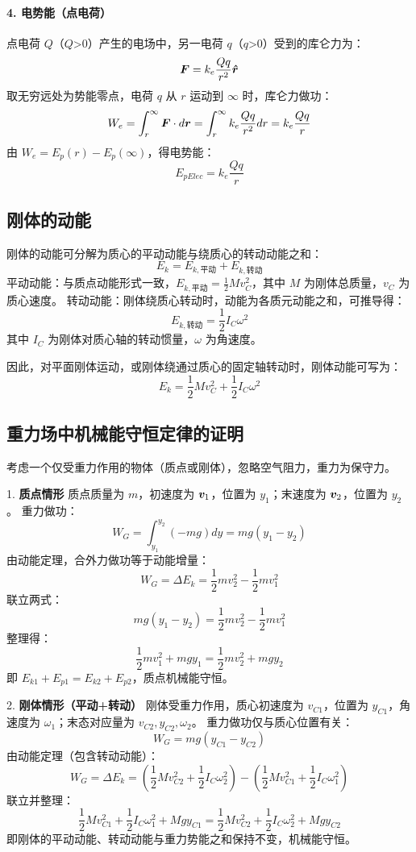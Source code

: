 \paragraph{4. 电势能（点电荷）}
点电荷 \(Q\)（\(Q\)>0）产生的电场中，另一电荷 \(q\)（\(q\)>0）受到的库仑力为：
\[
\boldsymbol{F} = k_e\frac{Qq}{r^2}\boldsymbol{\hat{r}}
\]
取无穷远处为势能零点，电荷 \(q\) 从 \(r\) 运动到 \(\infty\) 时，库仑力做功：
\[
W_e = \int_{r}^{\infty} \boldsymbol{F} \cdot d\boldsymbol{r} = \int_{r}^{\infty} k_e\frac{Qq}{r^2} dr = k_e\frac{Qq}{r}
\]
由 \(W_e = E_p(r) - E_p(\infty)\)，得电势能：
\[
E_{pElec} = k_e\frac{Qq}{r}
\]

\subsection{刚体的动能}
刚体的动能可分解为质心的平动动能与绕质心的转动动能之和：
\[
E_k = E_{k,\text{平动}} + E_{k,\text{转动}}
\]
平动动能：与质点动能形式一致，\(E_{k,\text{平动}} = \frac{1}{2}Mv_C^2\)，其中 \(M\) 为刚体总质量，\(v_C\) 为质心速度。
转动动能：刚体绕质心转动时，动能为各质元动能之和，可推导得：
\[
E_{k,\text{转动}} = \frac{1}{2}I_C\omega^2
\]
其中 \(I_C\) 为刚体对质心轴的转动惯量，\(\omega\) 为角速度。

因此，对平面刚体运动，或刚体绕通过质心的固定轴转动时，刚体动能可写为：
\[
E_k = \frac{1}{2}Mv_C^2 + \frac{1}{2}I_C\omega^2
\]

\subsection{重力场中机械能守恒定律的证明}
考虑一个仅受重力作用的物体（质点或刚体），忽略空气阻力，重力为保守力。

1.  \textbf{质点情形}
    质点质量为 \(m\)，初速度为 \(\boldsymbol{v}_1\)，位置为 \(y_1\)；末速度为 \(\boldsymbol{v}_2\)，位置为 \(y_2\)。
    重力做功：
    \[
    W_G = \int_{y_1}^{y_2} (-mg) dy = mg(y_1 - y_2)
    \]
    由动能定理，合外力做功等于动能增量：
    \[
    W_G = \Delta E_k = \frac{1}{2}mv_2^2 - \frac{1}{2}mv_1^2
    \]
    联立两式：
    \[
    mg(y_1 - y_2) = \frac{1}{2}mv_2^2 - \frac{1}{2}mv_1^2
    \]
    整理得：
    \[
    \frac{1}{2}mv_1^2 + mgy_1 = \frac{1}{2}mv_2^2 + mgy_2
    \]
    即 \(E_{k1} + E_{p1} = E_{k2} + E_{p2}\)，质点机械能守恒。

2.  \textbf{刚体情形（平动+转动）}
    刚体受重力作用，质心初速度为 \(v_{C1}\)，位置为 \(y_{C1}\)，角速度为 \(\omega_1\)；末态对应量为 \(v_{C2}, y_{C2}, \omega_2\)。
    重力做功仅与质心位置有关：
    \[
    W_G = mg(y_{C1} - y_{C2})
    \]
    由动能定理（包含转动动能）：
    \[
    W_G = \Delta E_k = \left(\frac{1}{2}Mv_{C2}^2 + \frac{1}{2}I_C\omega_2^2\right) - \left(\frac{1}{2}Mv_{C1}^2 + \frac{1}{2}I_C\omega_1^2\right)
    \]
    联立并整理：
    \[
    \frac{1}{2}Mv_{C1}^2 + \frac{1}{2}I_C\omega_1^2 + Mgy_{C1} = \frac{1}{2}Mv_{C2}^2 + \frac{1}{2}I_C\omega_2^2 + Mgy_{C2}
    \]
    即刚体的平动动能、转动动能与重力势能之和保持不变，机械能守恒。

